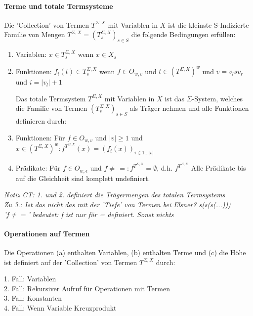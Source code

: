 \paragraph{ Terme und totale Termsysteme}
Die 'Collection' von Termen $T^{\Sigma,X}$ mit Variablen in $X$ ist die kleinste S-Indizierte Familie von Mengen $T^{\Sigma, X} = (T^{\Sigma, X}_s)_{s \in S}$ die folgende Bedingungen erfüllen:
\begin{enumerate}
\item Variablen: $x \in T^{\Sigma, X}_s $ wenn $x \in X_s$
\item Funktionen: $f_i(t) \in T^{\Sigma, X}_s $ wenn $f \in O_{w,v} $ und $t \in (T^{\Sigma, X})^w $ und $v = v_l sv_r$ und $i = |v_l| +1$

Das totale Termsystem $T^{\Sigma, X}$ mit Variablen in $X$ ist das $\Sigma$-System, welches die Familie von Termen $(T^{\Sigma, X}_s)_{s \in S}$ als Träger nehmen und alle Funktionen definieren durch:

\item Funktionen: Für $f \in O_{w,v} $ und $|v| \geq 1$ und $x \in (T^{\Sigma, X})^w: f^{T^{\Sigma, X}}(x) = (f_i(x))_{i \in 1 \dots |v|}$
\item Prädikate: Für $f \in O_{w, \epsilon}$ und $f \neq \, =: f^{T^{\Sigma, X}} = \emptyset$, d.h. $f^{T^{\Sigma, X}}$ Alle Prädikate bis auf die Gleichheit sind komplett undefiniert. 
\end{enumerate}

\emph{Notiz CT:  1. und 2. definiert die Trägermengen des totalen Termsystems \\
 Zu 3.: Ist das nicht das mit der 'Tiefe' von Termen bei Elsner? s(s(s(...))) \\
'$f \neq =$' bedeutet: f ist nur für = definiert. Sonst nichts}


\paragraph{ Operationen auf Termen}  
Die Operationen (a) enthalten Variablen, (b) enthalten Terme und (c) die Höhe ist definiert auf der 'Collection' von Termen $T^{\Sigma, X}$ durch:

1. Fall: Variablen \\
2. Fall: Rekursiver Aufruf für Operationen mit Termen \\
3. Fall: Konstanten \\
4. Fall: Wenn Variable Kreuzprodukt \\

